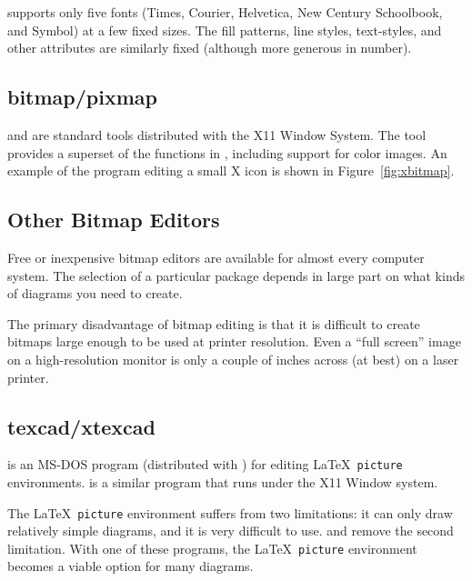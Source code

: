   supports only five fonts (Times, Courier, Helvetica,
  New Century Schoolbook, and Symbol) at a few fixed sizes.  The fill
  patterns, line styles, text-styles, and other attributes are similarly
  fixed (although more generous in number).

\subsection{bitmap/pixmap}

   and  are 
  standard tools distributed 
  with the X11 Window System.  The  tool provides a
  superset of the functions in , including support for
  color images.
  An example of the  program editing a small X icon is
  shown in Figure~\ref{fig:xbitmap}.


\subsection{Other Bitmap Editors}

  Free or inexpensive bitmap editors are 
  available for almost every
  computer system.  The selection of a particular package depends
  in large part on what kinds of diagrams you need to create.

  The primary disadvantage of bitmap editing is that it is difficult
  to create bitmaps large enough to be used at printer resolution.
  Even a ``full screen'' image on a high-resolution monitor is only
  a couple of inches across (at best) on a laser printer.

\newpage
\subsection{texcad/xtexcad}

   is an MS-DOS program (distributed with \emTeX)
  for editing \LaTeX\ \verb|picture| environments.  
  is a similar program that runs under the X11 Window system.

  The \LaTeX\ \verb|picture| environment 
  suffers from two limitations: it can only draw relatively
  simple diagrams, and it is very difficult to use.  
  and  remove the second limitation.  With
  one of these programs, the \LaTeX\ \verb|picture| environment
  becomes a viable option for many diagrams.


